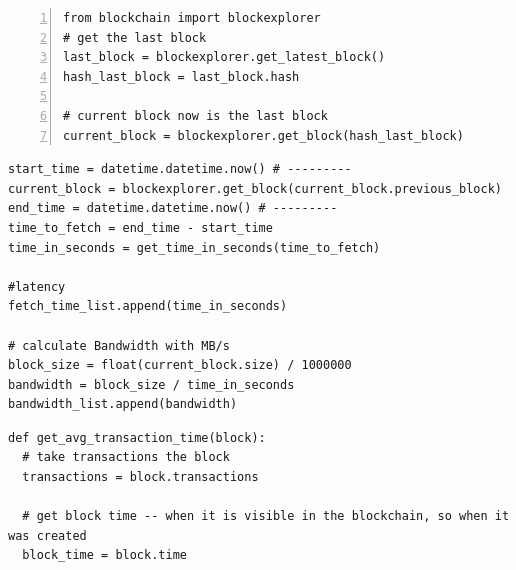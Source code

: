 \documentclass[USenglish]{uit-thesis}
\begin{document}
\begin{appendices}
\begin{lstlisting}[float, numbers=left, frame=single,caption={Calling \url{blockchain.info} through python \gls{api} and retrieving part of the blockchain.}]
from blockchain import blockexplorer
# get the last block
last_block = blockexplorer.get_latest_block()
hash_last_block = last_block.hash

# current block now is the last block
current_block = blockexplorer.get_block(hash_last_block)
\end{lstlisting}

\begin{lstlisting}[float, caption={How read bandwidth is calculated, using the function $datetime.now()$ before and after the \gls{api} call.}]
start_time = datetime.datetime.now() # ---------
current_block = blockexplorer.get_block(current_block.previous_block)
end_time = datetime.datetime.now() # ---------
time_to_fetch = end_time - start_time
time_in_seconds = get_time_in_seconds(time_to_fetch)

#latency
fetch_time_list.append(time_in_seconds)

# calculate Bandwidth with MB/s
block_size = float(current_block.size) / 1000000
bandwidth = block_size / time_in_seconds
bandwidth_list.append(bandwidth)
\end{lstlisting}

\begin{lstlisting}[float, caption={Function that get the average write bandwidth of the block, calculating the time for each transaction to be visible in the public ledger of data.}]
def get_avg_transaction_time(block):
  # take transactions the block
  transactions = block.transactions

  # get block time -- when it is visible in the blockchain, so when it was created
  block_time = block.time


\end{lstlisting}
\end{appendices}
\end{document}
